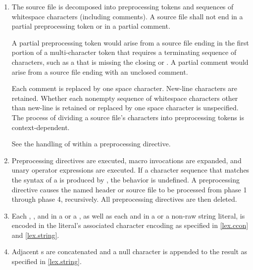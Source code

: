 \begin{enumerate}
\item The source file is decomposed into preprocessing
tokens and sequences of whitespace characters
(including comments). A source file shall not end in a partial
preprocessing token or in a partial comment.
\begin{footnote}
A partial preprocessing
token would arise from a source file
ending in the first portion of a multi-character token that requires a
terminating sequence of characters, such as a 
that is missing the closing 
or \tcode{>}. A partial comment
would arise from a source file ending with an unclosed \tcode{/*}
comment.
\end{footnote}
Each comment is replaced by one space character. New-line characters are
retained. Whether each nonempty sequence of whitespace characters other
than new-line is retained or replaced by one space character is
unspecified. The process of dividing a source file's
characters into preprocessing tokens is context-dependent.
\begin{example}
See the handling of \tcode{<} within a  preprocessing
directive.
\end{example}

\item Preprocessing directives are executed, macro invocations are
expanded, and  unary operator expressions are executed.
If a character sequence that matches the syntax of a
 is produced by , the behavior is undefined. A
 preprocessing directive causes the named header or
source file to be processed from phase 1 through phase 4, recursively.
All preprocessing directives are then deleted.

\item
Each
,
, and
in a  or a ,
as well as each
 and 
in a  or a non-raw string literal,
is encoded in the literal's associated character encoding as specified in
\ref{lex.ccon} and \ref{lex.string}.

\item
Adjacent s are concatenated
and a null character is appended to the result
as specified in \ref{lex.string}.


\end{enumerate}
